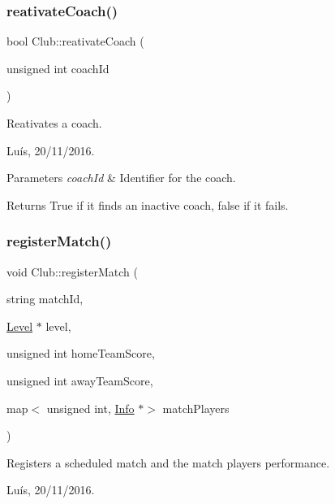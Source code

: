 \subsubsection{\texorpdfstring{reativate\+Coach()}{reativateCoach()}}
{\footnotesize\ttfamily bool Club\+::reativate\+Coach (\begin{DoxyParamCaption}\item[{unsigned int}]{coach\+Id }\end{DoxyParamCaption})}



Reativates a coach. 

Luís, 20/11/2016. 


\begin{DoxyParams}{Parameters}
{\em coach\+Id} & Identifier for the coach. \\
\hline
\end{DoxyParams}


\begin{DoxyReturn}{Returns}
True if it finds an inactive coach, false if it fails. 
\end{DoxyReturn}
\hypertarget{class_club_a92bf3c683dc8fbb4ef73672d8a241e40}{}\label{class_club_a92bf3c683dc8fbb4ef73672d8a241e40} 
\subsubsection{\texorpdfstring{register\+Match()}{registerMatch()}\hspace{0.1cm}{\footnotesize\ttfamily [1/4]}}
{\footnotesize\ttfamily void Club\+::register\+Match (\begin{DoxyParamCaption}\item[{string}]{match\+Id,  }\item[{\hyperlink{class_level}{Level} $\ast$}]{level,  }\item[{unsigned int}]{home\+Team\+Score,  }\item[{unsigned int}]{away\+Team\+Score,  }\item[{map$<$ unsigned int, \hyperlink{class_info}{Info} $\ast$$>$}]{match\+Players }\end{DoxyParamCaption})}



Registers a scheduled match and the match players performance. 

Luís, 20/11/2016. 


